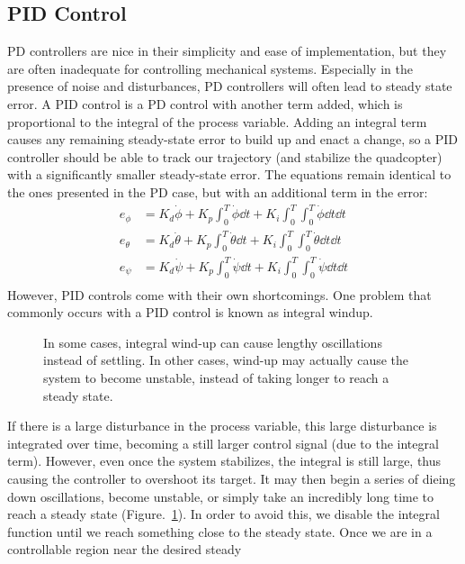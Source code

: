 \documentclass{article}
\begin{document}
\subsection*{PID Control}
PD controllers are nice in their simplicity and ease of implementation, but they are often
inadequate for controlling mechanical systems. Especially in the presence of noise and disturbances,
PD controllers will often lead to steady state error. A PID control is a PD control with another
term added, which is proportional to the integral of the process variable. Adding an integral term
causes any remaining steady-state error to build up and enact a change, so a PID controller should be able to track our
trajectory (and stabilize the quadcopter) with a significantly smaller steady-state error. The equations remain identical
to the ones presented in the PD case, but with an additional term in the error:
\begin{align*}
    e_\phi &= K_d\dot\phi + K_p \int_0^T\dot\phi\dd t + K_i \int_0^T\int_0^T\dot\phi\dd t\dd t \\
    e_\theta &= K_d\dot\theta + K_p \int_0^T\dot\theta\dd t + K_i \int_0^T\int_0^T\dot\theta\dd t\dd t \\
    e_\psi &= K_d\dot\psi + K_p \int_0^T\dot\psi\dd t + K_i \int_0^T\int_0^T\dot\psi\dd t\dd t \\
\end{align*}
However, PID controls come with their own shortcomings. One problem that commonly occurs with a PID control is known as integral windup. 
\begin{figure}[H]
    \caption{
        In some cases, integral wind-up can cause lengthy oscillations instead of settling. In other cases,
        wind-up may actually cause the system to become unstable, instead of taking longer to reach
        a steady state.
    }
    \label{windup}
\end{figure}
If there is a large disturbance in the process variable, this large disturbance is integrated over time, becoming a still
larger control signal (due to the integral term). However, even once the system stabilizes, the integral is still large, thus
causing the controller to overshoot its target. It may then begin a series of dieing down
oscillations, become unstable, or simply take an incredibly long time to reach a steady state
(Figure.~\ref{windup}). In order to avoid this, we disable the integral function until we reach
something close to the steady state. Once we are in a controllable region near the desired steady
\end{document}
